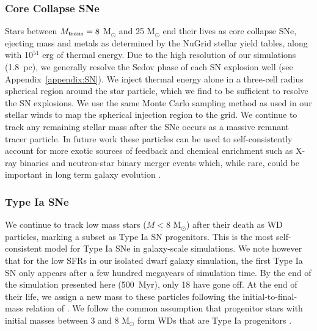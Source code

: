 \documentclass[fleqn,usenatbib,useAMS]{mnras}
\begin{document}
\subsubsection{Core Collapse SNe}
\label{sec: core collapse}
Stars between  $M_{\rm trans} = 8$ M$_{\odot}$ and 25 M$_{\odot}$ end their lives as core collapse SNe, ejecting mass and metals as determined by the NuGrid stellar yield tables, along with 10$^{51}$ erg of thermal energy. Due to the high resolution of our simulations (1.8~pc), we generally resolve the Sedov phase of each SN explosion well (see Appendix~\ref{appendix:SN}). We inject thermal energy alone in a three-cell radius spherical region around the star particle, which we find to be sufficient to resolve the SN explosions. We use the same Monte Carlo sampling method as used in our stellar winds to map the spherical injection region to the grid. We continue to track any remaining stellar mass after the SNe occurs as a massive remnant tracer particle. In future work these particles can be used to self-consistently account for more exotic sources of feedback and chemical enrichment such as X-ray binaries and neutron-star binary merger events which, while rare, could be important in long term galaxy evolution \citep[e.g.][]{Artale2015}.

\subsubsection{Type Ia SNe}
\label{sec:Type Ia}
We continue to track low mass stars ($M < 8$ M$_{\odot}$) after their death as WD particles, marking a subset as Type Ia SN progenitors. This is the most self-consistent model for Type Ia SNe in galaxy-scale simulations. We note however that for the low SFRs in our isolated dwarf galaxy simulation, the first Type Ia SN only appears after a few hundred megayears of simulation time. By the end of the simulation presented here (500~Myr), only 18 have gone off. At the end of their life, we assign a new mass to these particles following the initial-to-final-mass relation of \citet{Salaris2009}.
We follow the common assumption that progenitor stars with initial masses between 3 and 8 M$_{\odot}$ form WDs that are Type Ia progenitors \citep[see][ and references therein]{Cote2017a}. 
\end{document}
